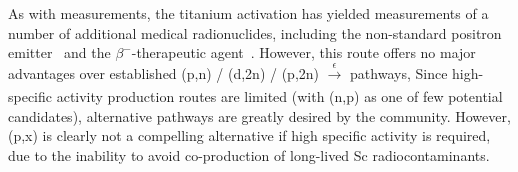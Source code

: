 As with  measurements, the titanium activation has  yielded measurements of  a number of additional  medical  radionuclides,  including the non-standard positron emitter
\,\cite{Muller2013,Filosofov2010,Qaim2011}
and the $\beta^-$-therapeutic agent 
\,\cite{Muller2014,Deilami-nezhad2016}.
However, this route offers no major advantages over established (p,n) / (d,2n) / (p,2n) $\xrightarrow[]{\epsilon}$  pathways,
Since high-specific activity  production routes are limited (with  (n,p) as one of few potential candidates), alternative pathways are greatly desired by the community.
However, (p,x) is clearly not a compelling alternative if high specific activity is required, due to the inability to avoid co-production of long-lived Sc radiocontaminants.




